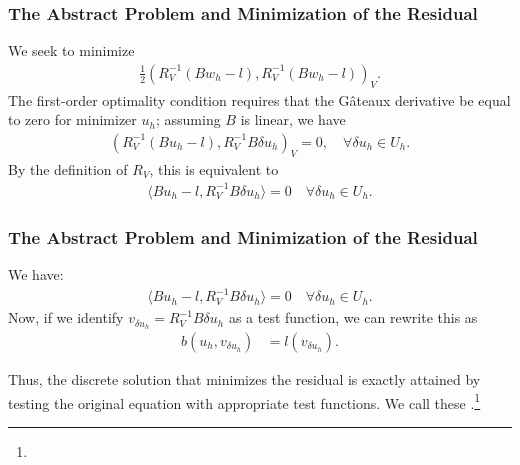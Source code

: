  
 \begin{frame}
 \frametitle{The Abstract Problem and Minimization of the Residual}
 We seek to minimize
 \begin{align*}
 \frac{1}{2} \left(R_{V}^{-1}\left(Bw_{h}-l\right), R_{V}^{-1}\left(Bw_{h}-l\right) \right)_{V}.
 \end{align*}
 The first-order optimality condition requires that the G\^ateaux derivative be equal to zero for minimizer $u_{h}$; assuming $B$ is linear, we have
 \begin{align*}
 \left(R_{V}^{-1}\left(Bu_{h}-l\right), R_{V}^{-1}B \delta u_{h} \right)_{V} = 0, \quad \forall \delta u_{h} \in U_{h}.
 \end{align*}
 By the definition of $R_{V}$, this is equivalent to
 \begin{align*} %
 \langle Bu_{h} - l, R_{V}^{-1}B \delta u_{h} \rangle = 0 \quad \forall \delta u_{h} \in U_{h}.
 \end{align*}
 \end{frame}
 \begin{comment}
 So the goal is to minimize this inner product. Obviously, the Gateaux
 derivative will be zero at the minimizer. And by definition of the Riesz
 map, we can turn this inner product into a duality pairing.
 \end{comment}
 
 
 \begin{frame}
 \frametitle{The Abstract Problem and Minimization of the Residual}
 We have:
 \begin{align*}
 \langle Bu_{h} - l, R_{V}^{-1}B \delta u_{h} \rangle = 0 \quad \forall \delta u_{h} \in U_{h}.
 \end{align*}
 Now, if we identify $v_{\delta u_{h}} = R_{V}^{-1}B \delta u_{h}$ as a test function, we can rewrite this as
 \begin{align*}
 b(u_{h},v_{\delta u_{h}}) &= l(v_{\delta u_{h}}).
 \end{align*}
 
 Thus, the discrete solution that minimizes the residual is exactly attained by
 testing the original equation with appropriate test functions.  We call these
 .\footnote{\FootSize {}}
 \end{frame}
 \begin{comment}
 We are getting close to a recognizable bilinear form again. If we now identify
 our test function as the inverse Riesz map applied to B applied to delta uh,
 we get a bilinear form with a very specific test function that minimizes the
 residual. We call these optimal test functions.
 \end{comment}


